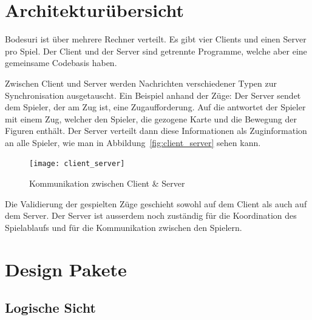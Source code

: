 \documentclass[12pt,halfparskip]{scrartcl}
\begin{document}


\section{Architekturübersicht}

Bodesuri ist über mehrere Rechner verteilt. Es gibt vier Clients und einen Server pro Spiel. Der Client und der Server sind getrennte Programme, welche aber eine gemeinsame Codebasis haben.

Zwischen Client und Server werden Nachrichten verschiedener Typen zur Synchronisation ausgetauscht. Ein Beispiel anhand der Züge: Der Server sendet dem Spieler, der am Zug ist, eine Zugaufforderung. Auf die antwortet der Spieler mit einem Zug, welcher den Spieler, die gezogene Karte und die Bewegung der Figuren enthält. Der Server verteilt dann diese Informationen als Zuginformation an alle Spieler, wie man in Abbildung~\vref{fig:client_server} sehen kann.

\begin{figure}[h]
	\centering
	\texttt{[image: client\_server]}
	\caption{Kommunikation zwischen Client \& Server}
	\label{fig:client_server}
\end{figure}

Die Validierung der gespielten Züge geschieht sowohl auf dem Client als auch auf dem Server. Der Server ist ausserdem noch zuständig für die Koordination des Spielablaufs und für die Kommunikation zwischen den Spielern.

\clearpage
\section{Design Pakete}
\label{design_pakete}

\subsection{Logische Sicht}
\label{sub:logische_sicht}
\end{document}
